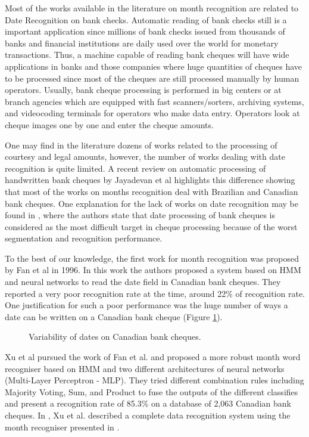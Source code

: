 \documentclass{article}[14pt, oneside, a4paper, times]
\begin{document}
Most of the works available in the literature on month recognition are related to Date Recognition on bank checks. Automatic reading of bank checks still is a important application since millions of bank checks issued from thousands of banks and financial institutions are daily used over the world for monetary transactions.  Thus, a machine capable of reading bank cheques will have wide applications in banks and those companies where huge quantities of cheques have to be processed since most of the cheques are still processed manually by human operators. Usually, bank cheque processing is performed in big centers or at branch agencies which are equipped with fast scanners/sorters, archiving systems, and videocoding terminals for operators who make data entry. Operators look at cheque images one by one and enter the cheque amounts.

One may find in the literature dozens of works related to the processing of courtesy and legal amounts, however, the number of works dealing with date recognition is quite limited. A recent review on automatic processing of handwritten bank cheques by Jayadevan et al \cite{Jayadevan2012} highlights this difference showing that most of the works on months recognition deal with Brazilian and Canadian bank cheques. One explanation for the lack of works on date recognition may be found in \cite{Houle1996}, where the authors state that date processing of bank cheques is considered as the most difficult target in cheque processing because of the worst segmentation and recognition performance.  

To the best of our knowledge, the first work for month recognition was proposed by Fan et al \cite{Fan96} in 1996. In this work the authors proposed a system based on HMM and neural networks to read the date field in Canadian bank cheques. They reported a very poor recognition rate at the time, around 22\% of recognition rate. One justification for such a poor performance was the huge number of ways a date can be written on a Canadian bank cheque (Figure \ref{canadiandates:fig}).  

\begin{figure}[htbp]
   \centering
   \caption{Variability of dates on Canadian bank cheques.}
   \label{canadiandates:fig}
\end{figure}

Xu et al \cite{Xu2002} pursued the work of Fan et al. and proposed a more robust month word recogniser based on HMM and two different architectures of neural networks (Multi-Layer Perceptron - MLP). They tried different combination rules including Majority Voting, Sum, and Product to fuse the outputs of the different classifies and present a recognition rate of 85.3\% on a database of 2,063 Canadian bank cheques. In \cite{Xu2003}, Xu et al. described a complete data recognition system using the month recogniser presented in \cite{Xu2002}.
\end{document}
